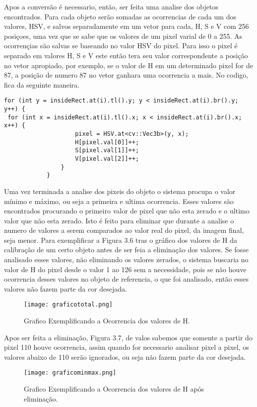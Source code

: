 Apos a conversão é necessario, então, ser feita uma analise dos objetos encontrados. Para cada objeto serão somadas as ocorrencias de cada um dos valores, HSV, e salvos separadamente em um vetor para cada, H, S e V com 256 posiçoes, uma vez que se sabe que os valores de um pixel varial de 0 a 255. As ocorrençias são salvas se baseando no valor HSV do pixel. Para isso o pixel é separado em valores H, S e V este então tera seu valor correspondente a posição no vetor apropiado, por exemplo, se o valor de H em um determinado pixel for de 87, a posição de numero 87 no vetor ganhara uma ocorrencia a mais. No codigo, fica da seguinte maneira.
		\begin{lstlisting}
for (int y = insideRect.at(i).tl().y; y < insideRect.at(i).br().y; y++) {
 for (int x = insideRect.at(i).tl().x; x < insideRect.at(i).br().x; x++) {
	                pixel = HSV.at<cv::Vec3b>(y, x);
	                H[pixel.val[0]]++;
	                S[pixel.val[1]]++;
	                V[pixel.val[2]]++;
	            }
	        }	\end{lstlisting}

Uma vez terminada a analise dos pixeis do objeto o sistema procupa o valor mínimo e máximo, ou seja a primeira e ultima ocorrencia. Esses valores são encontrados procurando o primeiro valor de pixel que não esta zerado e o ultimo valor que não esta zerado. Isto é feito para eliminar que durante a analise o numero de valores a serem comparados ao valor real do pixel, da imagem final, seja menor. Para exemplificar a Figura 3.6 tras o gráfico dos valores de H da calibração de um certo objeto antes de ser feia a eliminação dos valores. Se fosse analisado esses valores, não eliminando os valores zerados, o sistema buscaria no valor de H do pixel desde o valor 1 ao 126 sem a necessidade, pois se não houve ocorrencia desses valores no objeto de referencia, o que foi analisado, então esses valores não fazem parte da cor desejada.

\begin{figure}[!h]
	\centering
	\texttt{[image: graficototal.png]}
	\caption{Grafico Exemplificando a Ocorrencia dos valores de H.}
	\label{Grafico Exemplo}
\end{figure}

 Apos ser feita a eliminação, Figura 3.7, de valos sabemos que somente a partir do pixel 110 houve ocorrencia, assim quando for necessario analisar pixel a pixel, os valores abaixo de 110 serão ignorados, ou seja não fazem parte da cor desejada.
 \begin{figure}[!h]
 	\centering
 	\texttt{[image: graficominmax.png]}
 	\caption{Grafico Exemplificando a Ocorrencia dos valores de H após eliminação.}
 	\label{Grafico Exemplo}
 \end{figure}

